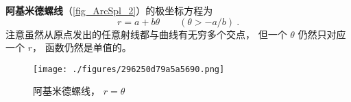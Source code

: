 
\begin{issues}
\issueNeedCite
\issueDraft
\end{issues}


\textbf{阿基米德螺线}（\autoref{fig_ArcSpl_2}）的极坐标方程为
\begin{equation}
r = a + b\theta \qquad (\theta > -a/b)~.
\end{equation}
注意虽然从原点发出的任意射线都与曲线有无穷多个交点， 但一个 $\theta$ 仍然只对应一个 $r$， 函数仍然是单值的。

\begin{figure}[ht]
\centering
\texttt{[image: ./figures/296250d79a5a5690.png]}
\caption{阿基米德螺线， $r = \theta$} \label{fig_ArcSpl_2}
\end{figure}
